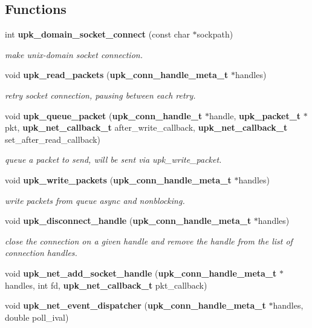 \subsection*{Functions}
\begin{DoxyCompactItemize}
\item 
int {\bf upk\_\-domain\_\-socket\_\-connect} (const char $\ast$sockpath)
\begin{DoxyCompactList}\small\item\em make unix-\/domain socket connection. \end{DoxyCompactList}\item 
void {\bf upk\_\-read\_\-packets} ({\bf upk\_\-conn\_\-handle\_\-meta\_\-t} $\ast$handles)
\begin{DoxyCompactList}\small\item\em retry socket connection, pausing between each retry. \end{DoxyCompactList}\item 
void {\bf upk\_\-queue\_\-packet} ({\bf upk\_\-conn\_\-handle\_\-t} $\ast$handle, {\bf upk\_\-packet\_\-t} $\ast$pkt, {\bf upk\_\-net\_\-callback\_\-t} after\_\-write\_\-callback, {\bf upk\_\-net\_\-callback\_\-t} set\_\-after\_\-read\_\-callback)
\begin{DoxyCompactList}\small\item\em queue a packet to send, will be sent via upk\_\-write\_\-packet. \end{DoxyCompactList}\item 
void {\bf upk\_\-write\_\-packets} ({\bf upk\_\-conn\_\-handle\_\-meta\_\-t} $\ast$handles)
\begin{DoxyCompactList}\small\item\em write packets from queue async and nonblocking. \end{DoxyCompactList}\item 
void {\bf upk\_\-disconnect\_\-handle} ({\bf upk\_\-conn\_\-handle\_\-meta\_\-t} $\ast$handles)
\begin{DoxyCompactList}\small\item\em close the connection on a given handle and remove the handle from the list of connection handles. \end{DoxyCompactList}\item 
void {\bf upk\_\-net\_\-add\_\-socket\_\-handle} ({\bf upk\_\-conn\_\-handle\_\-meta\_\-t} $\ast$handles, int fd, {\bf upk\_\-net\_\-callback\_\-t} pkt\_\-callback)
\item 
void {\bf upk\_\-net\_\-event\_\-dispatcher} ({\bf upk\_\-conn\_\-handle\_\-meta\_\-t} $\ast$handles, double poll\_\-ival)

\end{DoxyCompactItemize}
